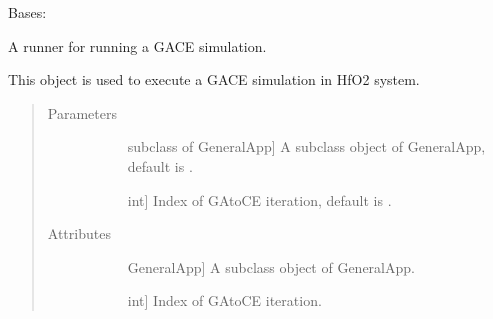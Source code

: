 \documentclass[letterpaper,10pt,english]{sphinxmanual}
\begin{document}
\begin{fulllineitems}
\label{\detokenize{pygace:pygace.general_gace.Runner}}
\sphinxAtStartPar
Bases: {\hyperref[\detokenize{pygace:pygace.gace.AbstractRunner}]{}}

\sphinxAtStartPar
A runner for running a GACE simulation.

\sphinxAtStartPar
This object is used to execute a GACE simulation in HfO2 system.
\begin{quote}\begin{description}
\item[{Parameters}] \leavevmode\begin{description}
\item[{}] \leavevmode{[}subclass of GeneralApp{]}
\sphinxAtStartPar
A subclass object of GeneralApp, default is .

\item[{}] \leavevmode{[}int{]}
\sphinxAtStartPar
Index of GA\sphinxhyphen{}to\sphinxhyphen{}CE iteration, default is .

\end{description}

\item[{Attributes}] \leavevmode\begin{description}
\item[{}] \leavevmode{[}GeneralApp{]}
\sphinxAtStartPar
A subclass object of GeneralApp.

\item[{}] \leavevmode{[}int{]}
\sphinxAtStartPar
Index of GA\sphinxhyphen{}to\sphinxhyphen{}CE iteration.

\end{description}

\end{description}\end{quote}


\end{fulllineitems}
\end{document}

